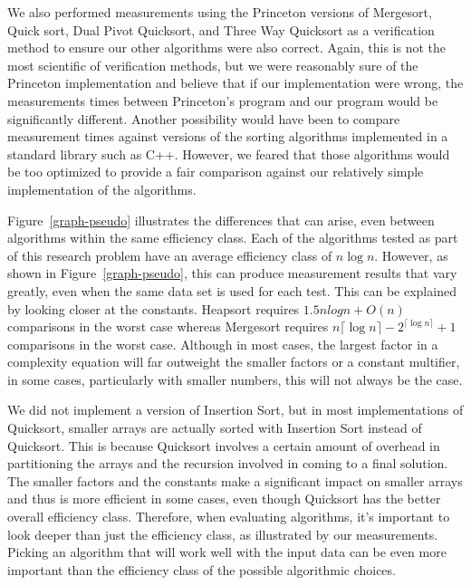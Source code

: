 \documentclass{article}
\begin{document}
We also performed measurements using the Princeton\cite{Princeton} versions of Mergesort,
Quick sort, Dual Pivot Quicksort, and Three Way Quicksort as a verification method to ensure
our other algorithms were also correct. Again, this is not the most scientific of verification methods,
but we were reasonably sure of the Princeton implementation and believe that if our
implementation were wrong, the measurements times between Princeton's program and our
program would be significantly different. Another possibility would have been to compare
measurement times against versions of the sorting algorithms implemented in a standard
library such as C++. However, we feared that those algorithms would be too optimized to
provide a fair comparison against our relatively simple implementation of the algorithms.

Figure~\ref{graph-pseudo} illustrates the differences that can arise, even
between algorithms within the same efficiency class. Each of the algorithms
tested as part of this research problem have an average efficiency class
of $n \log n$. However, as shown in Figure~\ref{graph-pseudo}, this can
produce measurement results that vary greatly, even when the same data
set is used for each test. This can be explained by looking closer at the
constants. Heapsort requires $1.5 n log n + O(n)$ comparisons in the
worst case\cite{Mehlhorn} whereas Mergesort requires 
$n \lceil\log n\rceil - 2^{\lceil \log n \rceil} + 1$ 
comparisons in the worst case\cite{knuth}. Although in most cases, the
largest factor in a complexity equation will far outweight the smaller
factors or a constant multifier, in some cases, particularly with smaller
numbers, this will not always be the case. 

We did not implement a version of Insertion Sort, but in most implementations
of Quicksort, smaller arrays are actually sorted with Insertion Sort
instead of Quicksort. This is because Quicksort involves a certain amount of
overhead in partitioning the arrays and the recursion involved in coming
to a final solution. The smaller factors and the constants make a significant
impact on smaller arrays and thus is more efficient in some cases, even
though Quicksort has the better overall efficiency class. Therefore,
when evaluating algorithms, it's important to look deeper than just the
efficiency class, as illustrated by our measurements. Picking an algorithm
that will work well with the input data can be even more important than
the efficiency class of the possible algorithmic choices. 
\end{document}

